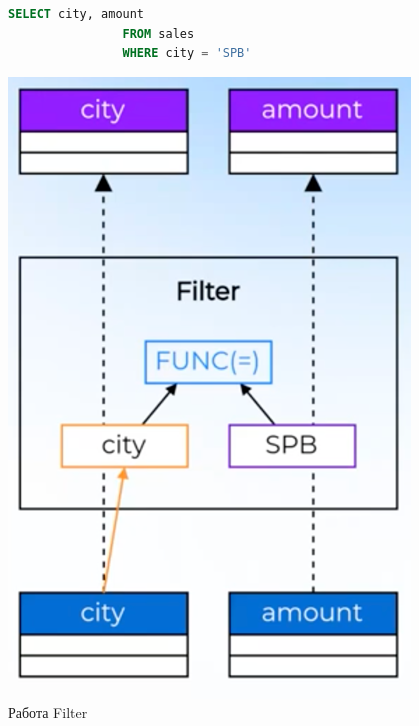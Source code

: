 \documentclass[11pt]{article}
\begin{document}
    \begin{figure}[h!]
        \begin{minipage}{0.4\textwidth}
            \begin{lstlisting}[language=SQL, caption={SQL приводящий в Filter}]
                SELECT city, amount
                FROM sales
                WHERE city = 'SPB'
            \end{lstlisting}
        \end{minipage}
        \begin{minipage}{0.6\textwidth}
            \centering
            \includegraphics[width=\textwidth]{Pictures/Operators/Filter}
            \caption{Работа Filter}
        \end{minipage}
    \end{figure}
\end{document}
